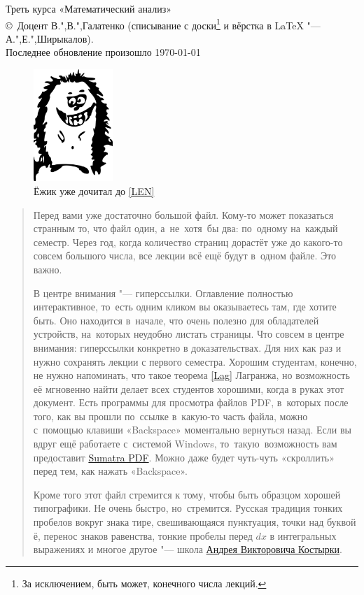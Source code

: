 \documentclass[a4paper,10pt,twoside]{article}
\newcommand{\bezcol}{\renewcommand{\headrulewidth}{0pt}\fancyhead{}}
\begin{document}
\bezcol
\pagestyle{empty}
\renewcommand{\thepage}{\Roman{page}}
\vspace*{2\baselineskip}
\begin{center}
{\huge Треть курса «Математический анализ»}\\[2ex]
\large\copyright~Доцент В.",В.",Галатенко (списывание с доски\footnote{%
За исключением, быть может, конечного числа лекций.} и вёрстка в \LaTeX{} "--- А.",Е.",Ширыкалов). \\[2ex]
Последнее обновление произошло \today
\end{center}

\begin{figure}[H]\centering
\includegraphics[width=30mm]{img/final/galat/main.pdf}\caption*{Ёжик уже дочитал до \ref{LEN}}
\end{figure}
\begin{abstract}
 Перед вами уже достаточно большой файл. Кому-то может показаться странным то, что файл один, а~не~хотя~бы два: по~одному на~каждый семестр.
 Через год, когда количество страниц дорастёт уже до какого-то совсем большого числа, все лекции всё ещё будут в~одном файле. Это важно.
 
 В центре внимания "--- гиперссылки. Оглавление полностью интерактивное, то~есть одним кликом вы оказываетесь там, где хотите быть.
 Оно находится в~начале, что очень полезно для обладателей устройств, на~которых неудобно листать страницы.
 Что совсем в центре внимания: гиперссылки конкретно в доказательствах.
 Для них как раз и нужно сохранять лекции с первого семестра.
 Хорошим студентам, конечно, не нужно напоминать, что такое теорема \ref{Lag} Лагранжа, но
 возможность её мгновенно найти делает всех студентов хорошими, когда в руках этот документ.
 Есть программы для просмотра файлов PDF, в~которых после того, как вы прошли по~ссылке в~какую-то
 часть файла, можно с~помощью клавиши «Backspace» моментально вернуться назад.
 Если вы вдруг ещё работаете с~системой Windows, то~такую~возможность вам предоставит
 \href{http://blog.kowalczyk.info/software/sumatrapdf/free-pdf-reader.html}{Sumatra PDF}. Можно даже будет
 чуть-чуть «скроллить» перед тем, как нажать «Backspace».
 
 Кроме того этот файл стремится к тому, чтобы быть образцом хорошей типографики. Не очень быстро, но~стремится.
 Русская традиция тонких пробелов вокруг знака тире, свешивающаяся пунктуация, точки над буквой ё, перенос знаков равенства, тонкие
 пробелы перед $dx$ в интегральных выражениях и многое другое "--- школа \href{http://kostyrka.ru/blog/}{Андрея Викторовича Костырки}.
  \end{abstract}
\end{document}
